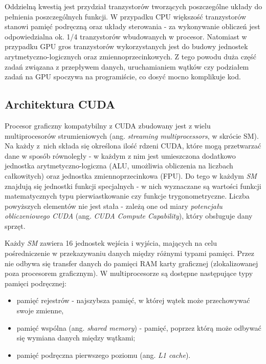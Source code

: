 \documentclass[12pt]{article}
\begin{document}
Oddzielną kwestią jest przydział tranzystorów tworzących poszczególne układy do pełnienia poszczególnych funkcji. W przypadku CPU większość tranzystorów stanowi pamięć podręczną oraz układy sterowania - za wykonywanie obliczeń jest odpowiedzialna ok. 1/4 tranzystorów wbudowanych w procesor. Natomiast w przypadku GPU gros tranzystorów wykorzystanych jest do budowy jednostek arytmetyczno-logicznych oraz zmiennoprzecinkowych. Z tego powodu duża część zadań związana z przepływem danych, uruchamianiem wątków czy podziałem zadań na GPU spoczywa na programiście, co dosyć mocno komplikuje kod.

\subsection{Architektura CUDA}

Procesor graficzny kompatybilny z CUDA zbudowany jest z wielu multiprocesorów strumieniowych (ang. \textit{streaming multiprocessors}, w skrócie SM). Na każdy z~nich składa się określona ilość rdzeni CUDA, które mogą przetwarzać dane w sposób równoległy - w każdym z nim jest umieszczona dodatkowo jednostka arytmetyczno-logiczna (ALU, umożliwia obliczenia na liczbach całkowitych) oraz jednostka zmiennoprzecinkowa (FPU). Do tego w każdym \textit{SM} znajdują się jednostki funkcji specjalnych - w nich wyznaczane są wartości funkcji matematycznych typu pierwiastkowanie czy funkcje trygonometryczne. Liczba powyższych elementów nie jest stała - zależą one od miary \textit{potencjału obliczeniowego CUDA} (ang. \textit{CUDA Compute Capability}), który obsługuje dany sprzęt.

Każdy \textit{SM} zawiera 16 jednostek wejścia i wyjścia, mających na celu pośredniczenie w przekazywaniu danych między różnymi typami pamięci. Przez nie odbywa się transfer danych do pamięci RAM karty graficznej (zlokalizowanej poza procesorem graficznym). W multiprocesorze są dostępne następujące typy pamięci podręcznej:

\begin{itemize}
\item pamięć rejestrów - najszybsza pamięć, w której wątek może przechowywać swoje zmienne,
\item pamięć wspólna (ang. \textit{shared memory}) - pamięć, poprzez którą może odbywać się wymiana danych między wątkami;
\item pamięć podręczna pierwszego poziomu (ang. \textit{L1 cache}).
\end{itemize}
\end{document}
